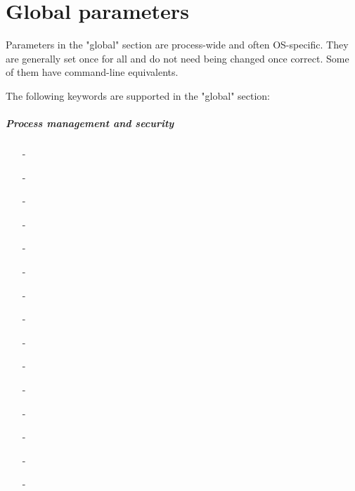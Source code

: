 \chapter{Global parameters}
\label{chap:global_parameters}

Parameters in the "global" section are process-wide and often OS-specific. They
are generally set once for all and do not need being changed once correct. Some
of them have command-line equivalents.

The following keywords are supported in the "global" section:

\begin{multicols}{2}
\paragraph*{Process management and security}
  \begin{itemize}
    \item[-] 
    \item[-] 
    \item[-] 
    \item[-] 
    \item[-] 
    \item[-] 
    \item[-] 
    \item[-] 
    \item[-] 
    \item[-] 
    \item[-] 
    \item[-] 
    \item[-] 
    \item[-] 
    \item[-] 
  \end{itemize}

\end{multicols}
